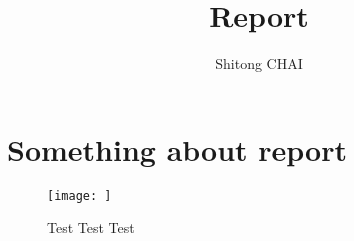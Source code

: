 \documentclass[a4paper, 12pt]{report}
\title{Report}
\date{}
\author{Shitong CHAI}
\begin{document}
\maketitle
\tableofcontents

\chapter {Something about report\cite{Nobody06}}

\begin{figure}[H]
\centering
\texttt{[image: ]}
\caption{Test Test Test}
\end{figure}


{}

\end{document}

